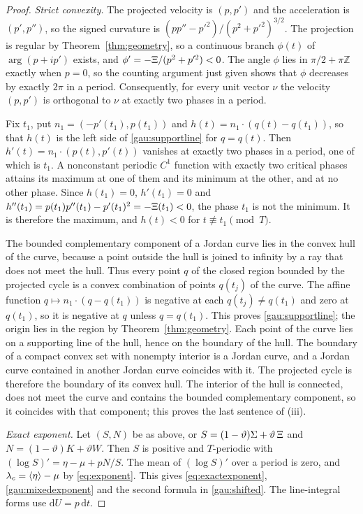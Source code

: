 \begin{proof}
\emph{Strict convexity.} The projected velocity is $(p,p')$ and the acceleration is $(p',p'')$, so the signed curvature is $(pp''-p'^2)/(p^2+p'^2)^{3/2}$. The projection is regular by Theorem~\ref{thm:geometry}, so a continuous branch $\phi(t)$ of $\arg(p+ip')$ exists, and $\phi'=-\Xi/(p^2+p'^2)<0$. The angle $\phi$ lies in $\pi/2+\pi\mathbb Z$ exactly when $p=0$, so the counting argument just given shows that $\phi$ decreases by exactly $2\pi$ in a period. Consequently, for every unit vector $\nu$ the velocity $(p,p')$ is orthogonal to $\nu$ at exactly two phases in a period.

Fix $t_1$, put $n_1=(-p'(t_1),p(t_1))$ and $h(t)=n_1\cdot(q(t)-q(t_1))$, so that $h(t)$ is the left side of \eqref{gau:supportline} for $q=q(t)$. Then $h'(t)=n_1\cdot(p(t),p'(t))$ vanishes at exactly two phases in a period, one of which is $t_1$. A nonconstant periodic $C^1$ function with exactly two critical phases attains its maximum at one of them and its minimum at the other, and at no other phase. Since $h(t_1)=0$, $h'(t_1)=0$ and $h''(t_1)=p(t_1)p''(t_1)-p'(t_1)^2=-\Xi(t_1)<0$, the phase $t_1$ is not the minimum. It is therefore the maximum, and $h(t)<0$ for $t\not\equiv t_1\pmod T$.

The bounded complementary component of a Jordan curve lies in the convex hull of the curve, because a point outside the hull is joined to infinity by a ray that does not meet the hull. Thus every point $q$ of the closed region bounded by the projected cycle is a convex combination of points $q(t_j)$ of the curve. The affine function $q\mapsto n_1\cdot(q-q(t_1))$ is negative at each $q(t_j)\ne q(t_1)$ and zero at $q(t_1)$, so it is negative at $q$ unless $q=q(t_1)$. This proves \eqref{gau:supportline}; the origin lies in the region by Theorem~\ref{thm:geometry}. Each point of the curve lies on a supporting line of the hull, hence on the boundary of the hull. The boundary of a compact convex set with nonempty interior is a Jordan curve, and a Jordan curve contained in another Jordan curve coincides with it. The projected cycle is therefore the boundary of its convex hull. The interior of the hull is connected, does not meet the curve and contains the bounded complementary component, so it coincides with that component; this proves the last sentence of (iii).

\emph{Exact exponent.} Let $(S,N)$ be as above, or $S=(1-\vartheta)\Sigma+\vartheta\,\Xi$ and $N=(1-\vartheta)K+\vartheta W$. Then $S$ is positive and $T$-periodic with $(\log S)'=\eta-\mu+pN/S$. The mean of $(\log S)'$ over a period is zero, and $\lambda_c=\left\langle \eta\right\rangle-\mu$ by \eqref{eq:exponent}. This gives \eqref{eq:exactexponent}, \eqref{gau:mixedexponent} and the second formula in \eqref{gau:shifted}. The line-integral forms use $\mathrm dU=p\,\mathrm dt$.


\end{proof}

